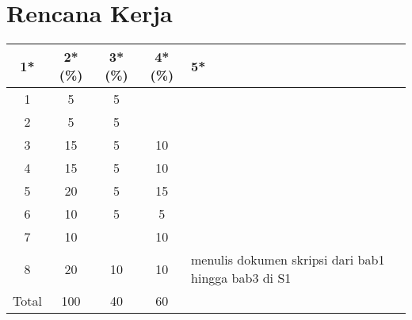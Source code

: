 \documentclass[a4paper,twoside]{article}
\begin{document}
\section{Rencana Kerja}


\begin{center}
  \begin{tabular}{ | c | c | c | c | l |}
    \hline
    1*  & 2*(\%) & 3*(\%) & 4*(\%) &5*\\ \hline \hline
    1 & 5 & 5 & & \\ \hline
    2 & 5 & 5 & & \\ \hline
    3 & 15 & 5 & 10 & \\ \hline
    4 & 15 & 5 & 10 & \\ \hline
    5 & 20 & 5 & 15 & \\ \hline
    6 & 10 & 5  & 5 & \\ \hline
    7 & 10 &  & 10 & \\ \hline
    8 & 20 & 10 & 10 & {\footnotesize menulis dokumen skripsi dari bab1 hingga bab3 di S1} \\ \hline
    Total & 100 & 40 & 60 & \\ \hline
                          \end{tabular}
\end{center}
\end{document}

